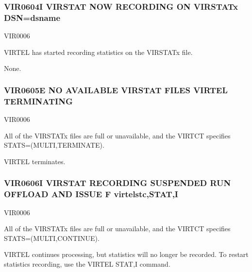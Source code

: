 \documentclass[letterpaper,10pt,english]{sphinxmanual}
\begin{document}
\subsubsection{VIR0604I VIRSTAT NOW RECORDING ON VIRSTATx DSN=dsname}
\label{\detokenize{messages:vir0604i-virstat-now-recording-on-virstatx-dsn-dsname}}\begin{description}
\sphinxAtStartPar
VIR0006

\sphinxAtStartPar
VIRTEL has started recording statistics on the VIRSTATx file.

\sphinxAtStartPar
None.

\end{description}


\subsubsection{VIR0605E NO AVAILABLE VIRSTAT FILES \sphinxhyphen{}VIRTEL TERMINATING}
\label{\detokenize{messages:vir0605e-no-available-virstat-files-virtel-terminating}}\begin{description}
\sphinxAtStartPar
VIR0006

\sphinxAtStartPar
All of the VIRSTATx files are full or unavailable, and the VIRTCT specifies STATS=(MULTI,TERMINATE).

\sphinxAtStartPar
VIRTEL terminates.

\end{description}


\subsubsection{VIR0606I VIRSTAT RECORDING SUSPENDED \sphinxhyphen{} RUN OFFLOAD AND ISSUE F virtelstc,STAT,I}
\label{\detokenize{messages:vir0606i-virstat-recording-suspended-run-offload-and-issue-f-virtelstc-stat-i}}\begin{description}
\sphinxAtStartPar
VIR0006

\sphinxAtStartPar
All of the VIRSTATx files are full or unavailable, and the VIRTCT specifies STATS=(MULTI,CONTINUE).

\sphinxAtStartPar
VIRTEL continues processing, but statistics will no longer be recorded. To restart statistics recording, use the VIRTEL STAT,I command.

\end{description}
\end{document}
